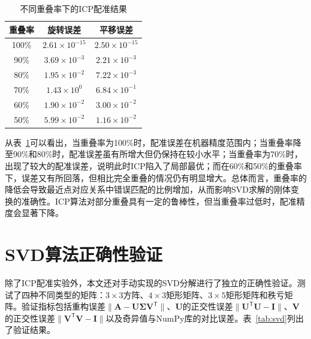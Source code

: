 \documentclass[a4paper,12pt]{ctexrep}
\begin{document}
\begin{table}[H]
    \centering
    \caption{不同重叠率下的ICP配准结果}
    \label{tab:overlap}
    \begin{tabular}{ccc}
        \toprule
        重叠率 & 旋转误差 & 平移误差 \\
        \midrule
        100\% & $2.61\times 10^{-15}$ & $2.50\times 10^{-15}$ \\
        90\%  & $3.69\times 10^{-3}$  & $2.21\times 10^{-3}$  \\
        80\%  & $1.95\times 10^{-2}$  & $7.22\times 10^{-3}$  \\
        70\%  & $1.43\times 10^{0}$   & $6.84\times 10^{-1}$  \\
        60\%  & $1.90\times 10^{-2}$  & $3.00\times 10^{-2}$  \\
        50\%  & $5.99\times 10^{-2}$  & $1.16\times 10^{-2}$  \\
        \bottomrule
    \end{tabular}
\end{table}

从表~\ref{tab:overlap}可以看出，当重叠率为100\%时，配准误差在机器精度范围内；当重叠率降至90\%和80\%时，配准误差虽有所增大但仍保持在较小水平；当重叠率为70\%时，出现了较大的配准误差，说明此时ICP陷入了局部最优；而在60\%和50\%的重叠率下，误差又有所回落，但相比完全重叠的情况仍有明显增大。总体而言，重叠率的降低会导致最近点对应关系中错误匹配的比例增加，从而影响SVD求解的刚体变换的准确性。ICP算法对部分重叠具有一定的鲁棒性，但当重叠率过低时，配准精度会显著下降。

\section{SVD算法正确性验证}

除了ICP配准实验外，本文还对手动实现的SVD分解进行了独立的正确性验证。测试了四种不同类型的矩阵：$3\times 3$方阵、$4\times 3$矩形矩阵、$3\times 5$矩形矩阵和秩亏矩阵。验证指标包括重构误差$\|\bm{A}-\bm{U}\bm{\Sigma}\bm{V}^{\mathsf{T}}\|$、$\bm{U}$的正交性误差$\|\bm{U}^{\mathsf{T}}\bm{U}-\bm{I}\|$、$\bm{V}$的正交性误差$\|\bm{V}^{\mathsf{T}}\bm{V}-\bm{I}\|$以及奇异值与NumPy库的对比误差。表~\ref{tab:svd}列出了验证结果。
\end{document}
